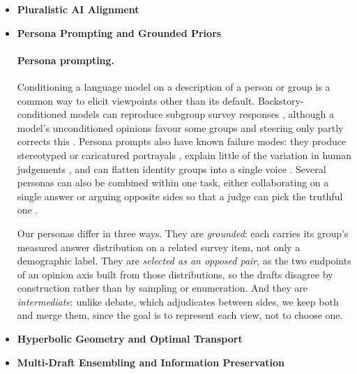 \documentclass[11pt]{article}
\begin{document}
{\color{red}
\begin{itemize}
    \item \textbf{Pluralistic AI Alignment}
    \item \textbf{Persona Prompting and Grounded Priors}

    \paragraph{Persona prompting.}
Conditioning a language model on a description of a person or group is a
common way to elicit viewpoints other than its default. Backstory-conditioned
models can reproduce subgroup survey responses \citep{argyle2023out}, although
a model's unconditioned opinions favour some groups and steering only partly
corrects this \citep{santurkar2023whose, durmus2023towards}. Persona prompts
also have known failure modes: they produce stereotyped or caricatured
portrayals \citep{cheng2023marked, cheng2023compost}, explain little of the
variation in human judgements \citep{hu2024quantifying}, and can flatten
identity groups into a single voice \citep{wang2025misportray}. Several personas
can also be combined within one task, either collaborating on a single answer
\citep{wang2024unleashing} or arguing opposite sides so that a judge can pick the
truthful one \citep{khan2024debating}.

Our personas differ in three ways. They are \emph{grounded}: each carries its
group's measured answer distribution on a related survey item, not only a
demographic label. They are \emph{selected as an opposed pair}, as the two
endpoints of an opinion axis built from those distributions, so the drafts
disagree by construction rather than by sampling or enumeration. And they are
\emph{intermediate}: unlike debate, which adjudicates between sides, we keep
both and merge them, since the goal is to represent each view, not to choose
one.

    \item \textbf{Hyperbolic Geometry and Optimal Transport}
    \item \textbf{Multi-Draft Ensembling and Information Preservation}

\end{itemize}}
\end{document}
